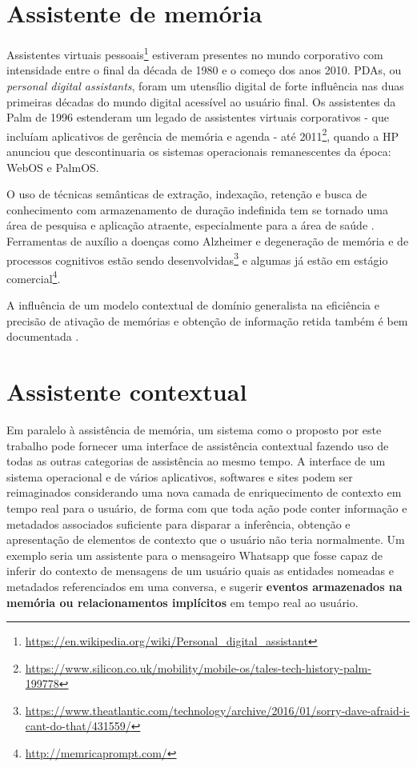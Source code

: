 \section{Assistente de memória}

Assistentes virtuais pessoais\footnote{\url{https://en.wikipedia.org/wiki/Personal_digital_assistant}} estiveram presentes no mundo corporativo com intensidade entre o final da década de 1980 e o começo dos anos 2010. PDAs, ou \textit{personal digital assistants}, foram um utensílio digital de forte influência nas duas primeiras décadas do mundo digital acessível ao usuário final. Os assistentes da Palm de 1996 estenderam um legado de assistentes virtuais corporativos - que incluíam aplicativos de gerência de memória e agenda - até 2011\footnote{\url{https://www.silicon.co.uk/mobility/mobile-os/tales-tech-history-palm-199778}}, quando a HP anunciou que descontinuaria os sistemas operacionais remanescentes da época: WebOS e PalmOS.

O uso de técnicas semânticas de extração, indexação, retenção e busca de conhecimento com armazenamento de duração indefinida tem se tornado uma área de pesquisa e aplicação atraente, especialmente para a área de saúde \cite{Costa2010MultiagentPM, Huang2012TowardAM}. Ferramentas de auxílio a doenças como Alzheimer e degeneração de memória e de processos cognitivos estão sendo desenvolvidas\footnote{\url{https://www.theatlantic.com/technology/archive/2016/01/sorry-dave-afraid-i-cant-do-that/431559/}} e algumas já estão em estágio comercial\footnote{\url{http://memricaprompt.com/}}.

A influência de um modelo contextual de domínio generalista na eficiência e precisão de ativação de memórias e obtenção de informação retida também é bem documentada \cite{Agarwal2017RememberingWY,Liu2017AnET,Ma2015KnowledgeGI,HakkaniTr2014ProbabilisticEO}.

\section{Assistente contextual}

Em paralelo à assistência de memória, um sistema como o proposto por este trabalho pode fornecer uma interface de assistência contextual fazendo uso de todas as outras categorias de assistência ao mesmo tempo. A interface de um sistema operacional e de vários aplicativos, softwares e sites podem ser reimaginados considerando uma nova camada de enriquecimento de contexto em tempo real para o usuário, de forma com que toda ação pode conter informação e metadados associados suficiente para disparar a inferência, obtenção e apresentação de elementos de contexto que o usuário não teria normalmente. Um exemplo seria um assistente para o mensageiro Whatsapp que fosse capaz de inferir do contexto de mensagens de um usuário quais as entidades nomeadas e metadados referenciados em uma conversa, e sugerir \textbf{eventos armazenados na memória ou relacionamentos implícitos} em tempo real ao usuário.


